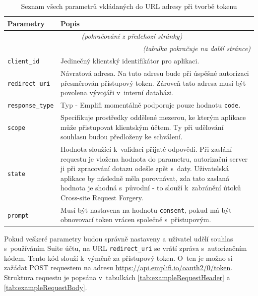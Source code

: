 \documentclass[czech, bc, kiv, he, iso690numb, viewonly]{fasthesis} %
\begin{document}
	\begin{longtable}{p{}p{}}
	\caption{Seznam všech parametrů vkládaných do URL adresy při tvorbě tokenu \cite{emplifiDocs}}
	\label{tab:allParametersAPI}\\
	\toprule[1.5pt]
	\textbf{Parametry} & \textbf{Popis}\\
	\midrule
	\endfirsthead
	\multicolumn{2}{c}{\tablename{}~\thetable{} \textit{(pokračování z předchozí stránky)}}\\
	\endhead
	\midrule
	\multicolumn{2}{r}{\textit{(tabulka pokračuje na další stránce)}}\\
	\endfoot
	\bottomrule[1.5pt]
	\endlastfoot
	\verb"client_id" &  Jedinečný klientský identifikátor pro aplikaci.\\
	\midrule
	\verb"redirect_uri" & Návratová adresa. Na tuto adresu bude při úspěšné autorizaci přesměrován přístupový token. Zároveň tato adresa musí být povolena vývojáři v~interní databázi.\\
	\midrule
	\verb"response_type" & Typ - Emplifi momentálně podporuje pouze hodnotu \texttt{code}.\\
	\midrule
	\verb"scope" & Specifikuje prostředky oddělené mezerou, ke kterým aplikace může přistupovat klientským účtem. Ty při udělování souhlasu budou předloženy ke schválení. \\
	\midrule
	\verb"state" & Hodnota sloužící k~validaci přijaté odpovědi. Při zaslání requestu je vložena hodnota do parametru, autorizační server ji při zpracování dotazu odešle zpět s~daty. Uživatelská aplikace by následně měla porovnávat, zda tato zaslaná hodnota je shodná s~původní - to slouží k~zabránění útoků Cross-site Request Forgery.\\
	\midrule
	\verb"prompt" & Musí být nastavena na hodnotu \texttt{consent}, pokud má být obnovovací token vrácen společně s~přístupovým.\\
	\end{longtable}

Pokud veškeré parametry budou správně nastaveny a uživatel udělí souhlas s~používáním Suite účtu, na URL \texttt{redirect\_uri} se vrátí zpráva s~autorizačním kódem. Tento kód
slouží k~výměně za přístupový token. O~ten je možno si zažádat POST requestem na adresu \url{https://api.emplifi.io/oauth2/0/token}. Struktura requestu je popsána v~tabulkách \ref{tab:exampleRequestHeader} a \ref{tab:exampleRequestBody}.
\end{document}
